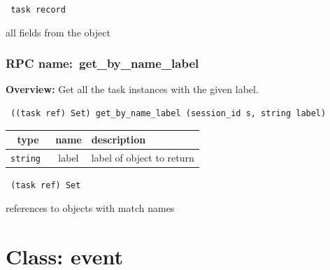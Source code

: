 \vspace{0.3cm}

{\tt 
task record
}


all fields from the object
\vspace{0.3cm}
\vspace{0.3cm}
\vspace{0.3cm}
\subsubsection{RPC name:~get\_by\_name\_label}

{\bf Overview:} 
Get all the task instances with the given label.

\begin{verbatim} ((task ref) Set) get_by_name_label (session_id s, string label)\end{verbatim}



 
\vspace{0.3cm}
\begin{tabular}{|c|c|p{7cm}|}
 \hline
{\bf type} & {\bf name} & {\bf description} \\ \hline
{\tt string } & label & label of object to return \\ \hline 

\end{tabular}

\vspace{0.3cm}

{\tt 
(task ref) Set
}


references to objects with match names
\vspace{0.3cm}
\vspace{0.3cm}
\vspace{0.3cm}

\vspace{1cm}
\newpage
\section{Class: event}
